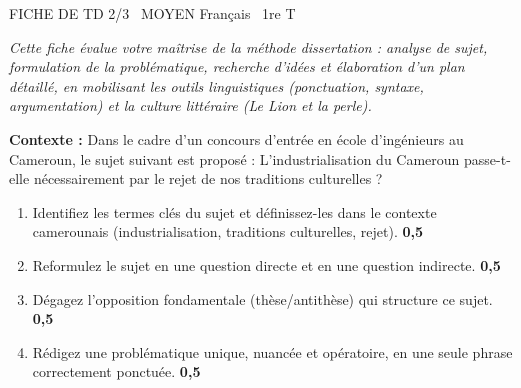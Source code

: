 \documentclass[11pt]{article}
\begin{document}
\begin{tcolorbox}[enhanced,colback=popink,colframe=popink,arc=10pt,boxrule=0pt,left=12pt,right=12pt,top=9pt,bottom=9pt]
{\color{white}\popxbold\small FICHE DE TD 2/3 \textbullet\ MOYEN \hfill Français \textbullet\ 1re T\par}
\end{tcolorbox}
\vspace{4pt}
\noindent \textit{Cette fiche évalue votre maîtrise de la méthode dissertation : analyse de sujet, formulation de la problématique, recherche d'idées et élaboration d'un plan détaillé, en mobilisant les outils linguistiques (ponctuation, syntaxe, argumentation) et la culture littéraire (Le Lion et la perle).}

\begin{exercice}
\textbf{Contexte :} Dans le cadre d'un concours d'entrée en école d'ingénieurs au Cameroun, le sujet suivant est proposé : \og L'industrialisation du Cameroun passe-t-elle nécessairement par le rejet de nos traditions culturelles ? \fg{}

\begin{enumerate}
    \item Identifiez les termes clés du sujet et définissez-les dans le contexte camerounais (industrialisation, traditions culturelles, rejet). \hfill\textbf{0,5}
    \item Reformulez le sujet en une question directe et en une question indirecte. \hfill\textbf{0,5}
    \item Dégagez l'opposition fondamentale (thèse/antithèse) qui structure ce sujet. \hfill\textbf{0,5}
    \item Rédigez une problématique unique, nuancée et opératoire, en une seule phrase correctement ponctuée. \hfill\textbf{0,5}
\end{enumerate}
\end{exercice}
\end{document}
